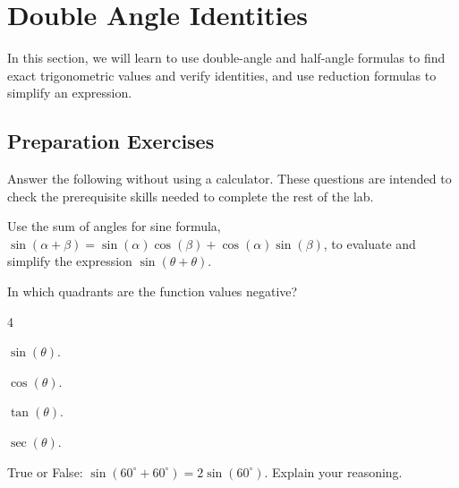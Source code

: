 
\section{Double Angle Identities} \label{section-double-angle-identities}
In this section, we will learn to use double-angle and half-angle formulas to find exact trigonometric values and verify identities, and use reduction formulas to simplify an expression.


\subsection*{Preparation Exercises} \label{preparation-exercises-section-double-angle-identities}

Answer the following without using a calculator. These questions are intended to check the prerequisite skills needed to complete the rest of the lab.

\begin{myPrep}
	Use the sum of angles for sine formula, $\sin(\alpha+\beta)=\sin(\alpha)\cos(\beta)+\cos(\alpha)\sin(\beta)$, to evaluate and simplify the expression $\sin(\theta+\theta)$.
\end{myPrep}
	\vspace{3cm}

\begin{myPrep}
	In which quadrants are the function values negative?
		\begin{enumerate}
		\end{enumerate}
\end{myPrep}
	\vfill

\begin{myPrep}
	True or False: $\sin(60^\circ+60^\circ)=2\sin(60^\circ)$. Explain your reasoning.
\end{myPrep}
	\vfill

